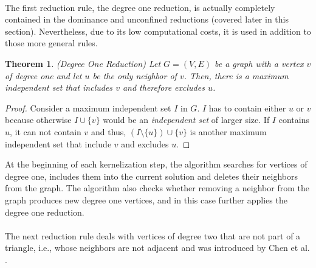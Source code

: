 \documentclass[]{article}
\newtheorem{theorem}{Theorem}
\begin{document}
\paragraph{}
The first reduction rule, the degree one reduction, is actually completely contained in the dominance and unconfined reductions (covered later in this section). 
Nevertheless, due to its low computational costs, it is used in addition to those more general rules. 

\begin{theorem} (Degree One Reduction) Let $G=(V,E)$ be a graph with a vertex $v$ of degree one and let $u$ be the only neighbor of $v$. Then, there is a maximum independent set that includes $v$ and therefore excludes $u$.	
\end{theorem}
\begin{proof}
	Consider a maximum independent set $I$ in $G$. $I$ has to contain either $u$ or $v$ because otherwise $I\cup\{v\}$ would be an \textit{independent set} of larger size. If $I$ contains $u$, it can not contain $v$ and thus, $(I\setminus\{u\})\cup\{v\}$ is another  maximum independent set that include $v$ and excludes $u$.
\end{proof}

At the beginning of each kernelization step, the algorithm searches for vertices of degree one, includes them into the current solution and deletes their neighbors from the graph. The algorithm also checks whether removing a neighbor from the graph produces new degree one vertices, and in this case further applies the degree one reduction. \paragraph{}
The next reduction rule deals with vertices of degree two that are not part of a triangle, i.e., whose neighbors are not adjacent and was introduced by Chen et al. \cite{ChenDeg2}.
\end{document}
